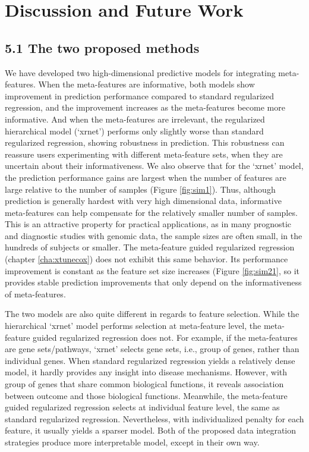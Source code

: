 \chapter{Discussion and Future Work}
\label{cha:conclusion}

\section*{5.1 \hspace{0.25cm} The two proposed methods}
We have developed two high-dimensional predictive models for integrating meta-features. When the meta-features are informative, both models show improvement in prediction performance compared to standard regularized regression, and the improvement increases as the meta-features become more informative. And when the meta-features are irrelevant, the regularized hierarchical model (`xrnet') performs only slightly worse than standard regularized regression, showing robustness in prediction. This robustness can reassure users experimenting with different meta-feature sets, when they are uncertain about their informativeness. We also observe  that for the `xrnet' model, the prediction performance gains are largest  when the number of features are large relative to the number of samples (Figure \ref{fig:sim1}). Thus, although prediction is generally hardest with very high dimensional data, informative meta-features can help compensate for the relatively smaller number of samples. This is an attractive property for practical applications, as in many prognostic and diagnostic studies with genomic data, the sample sizes are often small, in the hundreds of subjects or smaller. The meta-feature guided regularized regression (chapter \ref{cha:xtunecox}) does not exhibit this same behavior. Its performance improvement is constant as the feature set size increases (Figure \ref{fig:sim21}, so it provides stable prediction improvements that only depend on the informativeness of meta-features. 

The two models are also quite different in regards to feature selection. While the hierarchical `xrnet' model performs selection at meta-feature level, the meta-feature guided regularized regression does not. For example, if the meta-features are gene sets/pathways, `xrnet' selects gene sets, i.e., group of genes, rather than individual genes. When standard regularized regression yields a relatively dense model, it hardly provides any insight into disease mechanisms. However, with group of genes that share common biological functions, it reveals association between outcome and those biological functions. Meanwhile, the meta-feature guided regularized regression selects at individual feature level, the same as standard regularized regression. Nevertheless, with individualized penalty for each feature, it usually yields a sparser model. Both of the proposed data integration strategies produce more interpretable model, except in their own way. 

